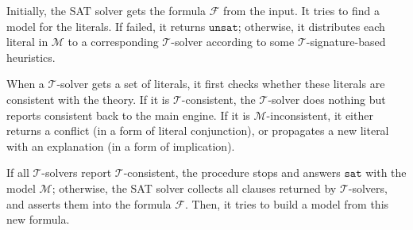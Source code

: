 Initially, the SAT solver gets the formula $\mathcal{F}$ from the input. It tries to find a model for the literals. If failed, it returns $\texttt{unsat}$; otherwise, it distributes each literal in $\mathcal{M}$ to a corresponding $\mathcal{T}$-solver according to some $\mathcal{T}$-signature-based heuristics.

When a $\mathcal{T}$-solver gets a set of literals, it first checks whether these literals are consistent with the theory. If it is $\mathcal{T}$-consistent, the $\mathcal{T}$-solver does nothing but reports consistent back to the main engine. If it is $\mathcal{M}$-inconsistent, it either returns a conflict (in a form of literal conjunction), or propagates a new literal with an explanation (in a form of implication).

If all $\mathcal{T}$-solvers report $\mathcal{T}$-consistent, the procedure stops and answers $\texttt{sat}$ with the model $\mathcal{M}$; otherwise, the SAT solver collects all clauses returned by $\mathcal{T}$-solvers, and asserts them into the formula $\mathcal{F}$. Then, it tries to build a model from this new formula.

